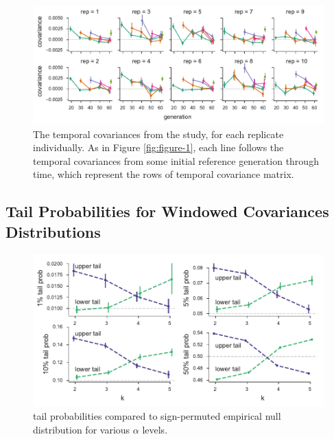 \documentclass[11pt]{article}
\begin{document}
\begin{figure}[!ht]
  \centering
  \includegraphics[width=\textwidth]{figures/barghi-cov-panels.pdf}

  \caption{The temporal covariances from the \textcite{Barghi2019-qy} study,
  for each replicate individually. As in Figure \ref{fig:figure-1}, each line
  follows the temporal covariances from some initial reference generation through
  time, which represent the rows of temporal covariance matrix.}

  \label{suppfig:barghi-cov-panels}
\end{figure}


\clearpage
\subsection{\textcite{Barghi2019-qy} Tail Probabilities for Windowed Covariances Distributions}

\begin{figure}[!ht]
  \centering
  \includegraphics[]{figures/barghi-tailprobs-panels.pdf}

  \caption{\textcite{Barghi2019-qy} tail probabilities compared to
  sign-permuted empirical null distribution for various $\alpha$ levels.}

  \label{suppfig:barghi-tailprobs-panels}
\end{figure}
\end{document}
